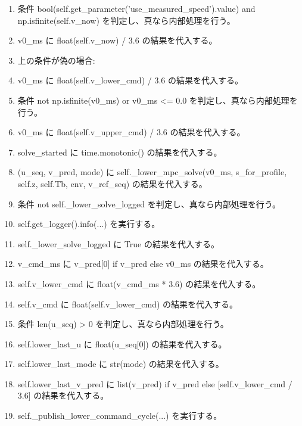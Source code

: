 \documentclass[a4paper,11pt]{article}
\begin{document}
\begin{enumerate}[leftmargin=1.8em]
\item 条件 bool(self.get\_parameter('use\_measured\_speed').value) and np.isfinite(self.v\_now) を判定し、真なら内部処理を行う。
\item   v0\_ms に float(self.v\_now) / 3.6 の結果を代入する。
\item   上の条件が偽の場合:
\item   v0\_ms に float(self.v\_lower\_cmd) / 3.6 の結果を代入する。
\item   条件 not np.isfinite(v0\_ms) or v0\_ms <= 0.0 を判定し、真なら内部処理を行う。
\item     v0\_ms に float(self.v\_upper\_cmd) / 3.6 の結果を代入する。
\item solve\_started に time.monotonic() の結果を代入する。
\item (u\_seq, v\_pred, mode) に self.\_lower\_mpc\_solve(v0\_ms, s\_for\_profile, self.z, self.Tb, env, v\_ref\_seq) の結果を代入する。
\item 条件 not self.\_lower\_solve\_logged を判定し、真なら内部処理を行う。
\item   self.get\_logger().info(...) を実行する。
\item   self.\_lower\_solve\_logged に True の結果を代入する。
\item v\_cmd\_ms に v\_pred[0] if v\_pred else v0\_ms の結果を代入する。
\item self.v\_lower\_cmd に float(v\_cmd\_ms * 3.6) の結果を代入する。
\item self.v\_cmd に float(self.v\_lower\_cmd) の結果を代入する。
\item 条件 len(u\_seq) > 0 を判定し、真なら内部処理を行う。
\item   self.lower\_last\_u に float(u\_seq[0]) の結果を代入する。
\item self.lower\_last\_mode に str(mode) の結果を代入する。
\item self.lower\_last\_v\_pred に list(v\_pred) if v\_pred else [self.v\_lower\_cmd / 3.6] の結果を代入する。
\item self.\_publish\_lower\_command\_cycle(...) を実行する。
            \end{enumerate}
\end{document}
